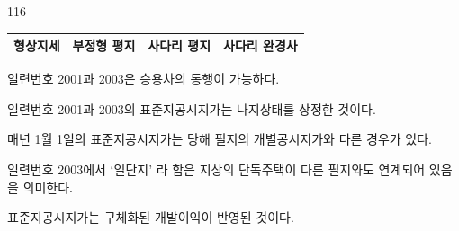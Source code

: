 \begin{question}{116}
\begin{center}
{\begin{tabular}{|c|c|c|c|}
형상지세 & 부정형 평지 & 사다리 평지 & 사다리 완경사 \\ \hline
\end{tabular}}
\end{center}
\begin{choices}
  \item 일련번호 2001과 2003은 승용차의 통행이 가능하다.
  \item 일련번호 2001과 2003의 표준지공시지가는 나지상태를 상정한 것이다.
  \item 매년 1월 1일의 표준지공시지가는 당해 필지의 개별공시지가와 다른 경우가 있다.
  \item 일련번호 2003에서 ‘일단지’ 라 함은 지상의 단독주택이 다른 필지와도 연계되어 있음을 의미한다.
  \item 표준지공시지가는 구체화된 개발이익이 반영된 것이다.
\end{choices}
\end{question}

